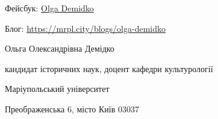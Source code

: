 Фейсбук: \href{https://www.facebook.com/profile.php?id=100009080371413}{Olga Demidko}\par
Блог: \url{https://mrpl.city/blogs/olga-demidko}\par
\linkDemidkoWorksMDU\par
\linkDemidkoWorksIA\par
\linkDemidkoWorksGoogleScholar\par
Ольга Олександрівна Демідко\par
кандидат історичних наук, доцент кафедри культурології\par
Маріупольський університет\par
Преображенська 6, місто Київ 03037\par

\endgroup






% 





